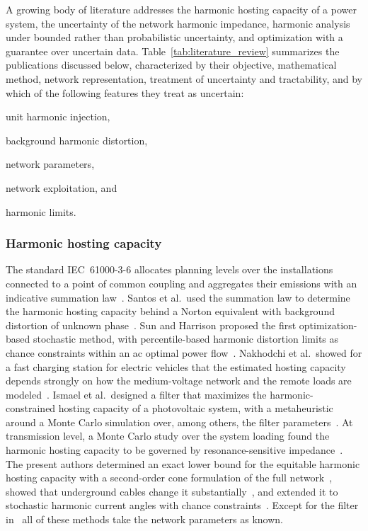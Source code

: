 A growing body of literature addresses the harmonic hosting capacity of a power system, the uncertainty of the network harmonic impedance, harmonic analysis under bounded rather than probabilistic uncertainty, and optimization with a guarantee over uncertain data. Table~\ref{tab:literature_review} summarizes the publications discussed below, characterized by their objective, mathematical method, network representation, treatment of uncertainty and tractability, and by which of the following features they treat as uncertain:
\begin{enumerate*}
    \item [(a)] unit harmonic injection,
    \item [(b)] background harmonic distortion,
    \item [(c)] network parameters,
    \item [(d)] network exploitation, and
    \item [(e)] harmonic limits.
\end{enumerate*}

\subsubsection{Harmonic hosting capacity}

The standard IEC~61000-3-6 allocates planning levels over the installations connected to a point of common coupling and aggregates their emissions with an indicative summation law~\cite{noauthor_iec61000-3-6_2008}. Santos et al.\ used the summation law to determine the harmonic hosting capacity behind a Norton equivalent with background distortion of unknown phase~\cite{santos_considerations_2015}. Sun and Harrison proposed the first optimization-based stochastic method, with percentile-based harmonic distortion limits as chance constraints within an ac optimal power flow~\cite{sun_distribution_2022}. Nakhodchi et al.\ showed for a fast charging station for electric vehicles that the estimated hosting capacity depends strongly on how the medium-voltage network and the remote loads are modeled~\cite{nakhodchi_impact_2023}. Ismael et al.\ designed a filter that maximizes the harmonic-constrained hosting capacity of a photovoltaic system, with a metaheuristic around a Monte Carlo simulation over, among others, the filter parameters~\cite{ismael_probabilistic_2019}. At transmission level, a Monte Carlo study over the system loading found the harmonic hosting capacity to be governed by resonance-sensitive impedance~\cite{emini_study_2026}. The present authors determined an exact lower bound for the equitable harmonic hosting capacity with a second-order cone formulation of the full network~\cite{vanacker_hosting_2026}, showed that underground cables change it substantially~\cite{vanacker_impact_2025}, and extended it to stochastic harmonic current angles with chance constraints~\cite{vanacker_shhc}. Except for the filter in~\cite{ismael_probabilistic_2019} all of these methods take the network parameters as known.

